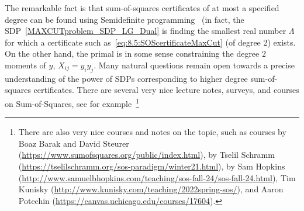 The remarkable fact is that sum-of-squares certificates of at most a specified degree can be found using Semidefinite programming~\cite{Parrilo_thesis_SOS,Lassere_01_SOS} (in fact, the SDP~\eqref{MAXCUTproblem_SDP_LG_Dual} is finding the smallest real number $\Lambda$ for which a certificate such as~\eqref{eq:8.5:SOScertificateMaxCut} (of degree 2) exists.  
On the other hand, the primal is in some sense constraining the degree $2$ moments of $y$, $X_{ij}=y_iy_j$. Many natural questions remain open towards a precise understanding of the power of SDPs corresponding to higher degree sum-of-squares certificates. There are several very nice lecture notes, surveys, and courses on Sum-of-Squares, see for example~\cite{Barak_SOS_LectureNotes,Fleming-etal-proofsandalgorithms,Steurer-etal-ICM2018}\footnote{There are also very nice courses and notes on the topic, such as courses by Boaz Barak and David Steurer (\url{https://www.sumofsquares.org/public/index.html}), by Tselil Schramm (\url{https://tselilschramm.org/sos-paradigm/winter21.html}), by Sam Hopkins (\url{http://www.samuelbhopkins.com/teaching/sos-fall-24/sos-fall-24.html}), Tim Kunisky (\url{http://www.kunisky.com/teaching/2022spring-sos/}), and Aaron Potechin (\url{https://canvas.uchicago.edu/courses/17604}).}

